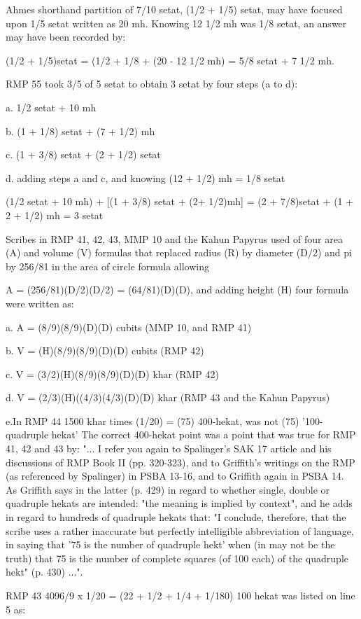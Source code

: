 \documentclass[12pt]{article}
\begin{document}
Ahmes shorthand partition of 7/10 setat, (1/2 + 1/5) setat, may have focused upon 1/5 setat written as 20 mh. Knowing 12 1/2 mh was 1/8 setat, an answer may have been recorded by:

(1/2 + 1/5)setat = (1/2 + 1/8 + (20 - 12 1/2 mh) = 5/8 setat + 7 1/2 mh. 

RMP 55 took 3/5 of 5 setat to obtain 3 setat by four steps (a to d):

a. 1/2 setat + 10 mh

b. (1 + 1/8) setat + (7 + 1/2) mh

c. (1 + 3/8) setat + (2 + 1/2) setat

d. adding steps a and c, and knowing (12 + 1/2) mh = 1/8 setat

(1/2 setat + 10 mh) + [(1 + 3/8) setat + (2+ 1/2)mh] = (2 + 7/8)setat + (1 + 2 + 1/2) mh = 3 setat

Scribes in RMP 41, 42, 43, MMP 10 and the Kahun Papyrus used of four area (A) and volume (V) formulas that replaced radius (R) by diameter (D/2) and pi by 256/81 in the area of circle formula allowing 

A = (256/81)(D/2)(D/2) = (64/81)(D)(D), and adding height (H) four formula were written as:

a. A = (8/9)(8/9)(D)(D) cubits   (MMP 10, and RMP 41)

b. V = (H)(8/9)(8/9)(D)(D) cubits  (RMP 42)

c. V = (3/2)(H)(8/9)(8/9)(D)(D) khar (RMP 42)

d. V = (2/3)(H)((4/3)(4/3)(D)(D) khar (RMP 43 and the Kahun Papyrus)

e.In RMP 44 1500 khar times (1/20) = (75) 400-hekat, was not (75) '100-quadruple hekat'  The correct 400-hekat point was a point that was true for RMP 41, 42 and 43 by: "... I refer you again to Spalinger's  SAK 17 article and his discussions of RMP Book II (pp. 320-323), and to Griffith's writings on the RMP (as referenced by Spalinger) in PSBA 13-16, and to Griffith again in PSBA 14. As Griffith says in the latter (p. 429) in regard to whether single, double or quadruple hekats are intended: "the meaning is implied by context", and he adds in regard to hundreds of quadruple hekats that: "I conclude, therefore, that the scribe uses a rather inaccurate but perfectly intelligible abbreviation of language, in saying that '75 is the number of quadruple hekt' when (in may not be the truth) that 75 is the number of complete squares (of 100 each) of the quadruple hekt" (p. 430) ...".

RMP 43 4096/9 x 1/20 = (22 + 1/2 + 1/4 + 1/180) 100 hekat was listed on line 5 as:
\end{document}
